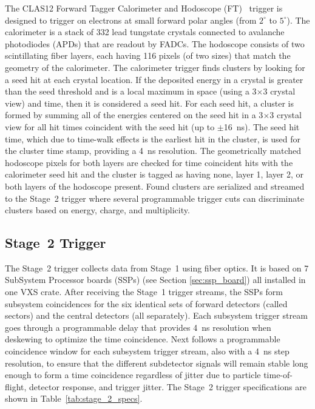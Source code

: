 The CLAS12 Forward Tagger Calorimeter and Hodoscope (FT)~\cite{ft-ref} trigger is designed to trigger on
electrons at small forward polar angles (from $2^\circ$  to $5^\circ$). The calorimeter is a stack of 332 lead
tungstate crystals connected to avalanche photodiodes (APDs) that are readout by FADCs. The hodoscope
consists of two scintillating fiber layers, each having 116 pixels (of two sizes) that match the geometry of the
calorimeter. The calorimeter trigger finds clusters by looking for a seed hit at each crystal location. If the
deposited energy in a crystal is greater than the seed threshold and is a local maximum in space (using a
3$\times$3 crystal view) and time, then it is considered a seed hit. For each seed hit, a cluster is formed by
summing all of the energies centered on the seed hit in a 3$\times$3 crystal view for all hit times coincident
with the seed hit (up to $\pm$16~ns). The seed hit time, which due to time-walk effects is the earliest hit in
the cluster, is used for the cluster time stamp, providing a 4~ns resolution. The geometrically matched hodoscope
pixels for both layers are checked for time coincident hits with the calorimeter seed hit and the cluster is
tagged as having none, layer 1, layer 2, or both layers of the hodoscope present. Found clusters are serialized
and streamed to the Stage~2 trigger where several programmable trigger cuts can discriminate clusters based
on energy, charge, and multiplicity.

\subsection{Stage~2 Trigger}

The Stage~2 trigger collects data from Stage~1 using fiber optics. It is based on 7 SubSystem Processor
boards (SSPs) (see Section \ref*{sec:ssp_board}) all installed in one VXS crate. After receiving the Stage~1
trigger streams, the SSPs form subsystem coincidences for the six identical sets of forward detectors (called
sectors) and the central detectors (all separately). Each subsystem trigger stream goes through a programmable
delay that provides 4~ns resolution when deskewing to optimize the time coincidence. Next follows a
programmable coincidence window for each subsystem trigger stream, also with a 4~ns step resolution, to ensure
that the different subdetector signals will remain stable long enough to form a time coincidence regardless of
jitter due to particle time-of-flight, detector response, and trigger jitter. The Stage~2 trigger specifications
are shown in Table~\ref{tab:stage_2_specs}.

